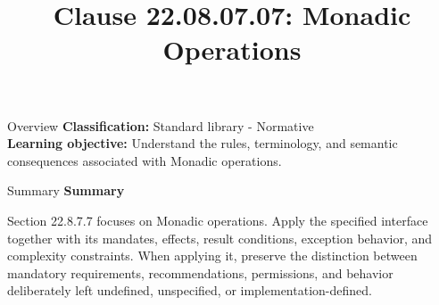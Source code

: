 \documentclass[10pt,letterpaper]{article}
\title{Clause 22.08.07.07: Monadic Operations}
\author{}
\date{}
\begin{document}
\maketitle
\begin{CornellOverviewBox}{Overview}
\textbf{Classification:} Standard library - Normative\\[2pt]
\textbf{Learning objective:} Understand the rules, terminology, and semantic consequences associated with Monadic operations.
\end{CornellOverviewBox}\begin{CornellSummaryBox}{Summary}
{\sffamily\bfseries\color{Accent} Summary}\par\vspace{3pt}Section 22.8.7.7 focuses on Monadic operations. Apply the specified interface together with its mandates, effects, result conditions, exception behavior, and complexity constraints. When applying it, preserve the distinction between mandatory requirements, recommendations, permissions, and behavior deliberately left undefined, unspecified, or implementation-defined.
\end{CornellSummaryBox}
\end{document}
